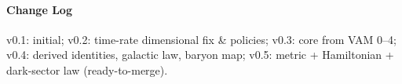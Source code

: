 \documentclass[11pt,a4paper]{article}
\begin{document}
    \paragraph*{Change Log}
    v0.1: initial; v0.2: time-rate dimensional fix \& policies; v0.3: core from VAM 0–4; v0.4: derived identities, galactic law, baryon map; v0.5: metric + Hamiltonian + dark-sector law (ready-to-merge).
\end{document}
